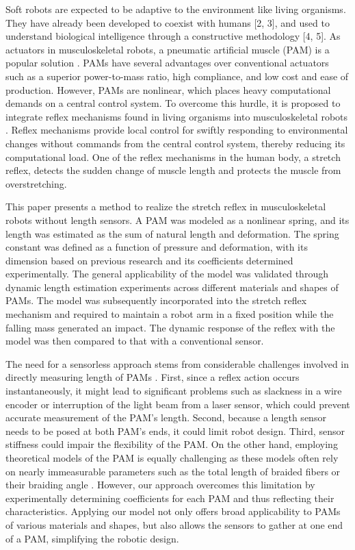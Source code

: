 Soft robots are expected to be adaptive to the environment like living organisms\cite{rus_design_2015}. They have already been developed to coexist with humans [2, 3], and used to understand biological intelligence through a constructive methodology [4, 5]. As actuators in musculoskeletal robots, a pneumatic artificial muscle (PAM) is a popular solution \cite{mirvakili_artificial}. PAMs have several advantages over conventional actuators such as a superior power-to-mass ratio\cite{Dynamic}, high compliance\cite{SDCharacteristics}, and low cost and ease of production\cite{ashwin_survey_2018}.
However, PAMs are nonlinear, which places heavy computational demands on a central control system.
To overcome this hurdle, it is proposed to integrate reflex mechanisms found in living organisms into musculoskeletal robots \cite{takahashi}.
Reflex mechanisms provide local control for swiftly responding to environmental changes without commands from the central control system, thereby reducing its computational load. 
One of the reflex mechanisms in the human body, a stretch reflex, detects the sudden change of muscle length \cite{kandel} and protects the muscle from overstretching.

This paper presents a method to realize the stretch reflex in musculoskeletal robots without length sensors. A PAM was modeled as a nonlinear spring, and its length was estimated as the sum of natural length and deformation. The spring constant was defined as a function of pressure and deformation, with its dimension based on previous research and its coefficients determined experimentally. The general applicability of the model was validated through dynamic length estimation experiments across different materials and shapes of PAMs. The model was subsequently incorporated into the stretch reflex mechanism and required to maintain a robot arm in a fixed position while the falling mass generated an impact. The dynamic response of the reflex with the model was then compared to that with a conventional sensor. 

The need for a sensorless approach stems from considerable challenges involved in directly measuring length of PAMs \cite{nakajima}.
First, since a reflex action occurs instantaneously, it might lead to significant problems such as slackness in a wire encoder or interruption of the light beam from a laser sensor, 
which could prevent accurate measurement of the PAM's length. 
Second, because a length sensor needs to be posed at both PAM's ends, it could limit robot design. 
Third, sensor stiffness could impair the flexibility of the PAM. On the other hand, employing theoretical models of the PAM is equally challenging as these models often rely on nearly immeasurable parameters such as the total length of braided fibers or their braiding angle \cite{motion}. However, our approach overcomes this limitation by experimentally determining coefficients for each PAM and thus reflecting their characteristics. Applying our model not only offers broad applicability to PAMs of various materials and shapes, but also allows the sensors to gather at one end of a PAM, simplifying the robotic design. 



